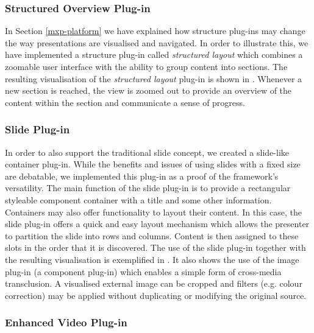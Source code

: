 \documentclass[a4paper,12pt]{report}
\begin{document}
    \subsubsection{Structured Overview Plug-in}

     In Section \ref{mxp-platform} we have explained how structure plug-ins may
     change the way presentations are visualised and navigated. In order to
     illustrate this, we have implemented a structure plug-in called
     \emph{structured layout} which combines a zoomable user interface with the
     ability to group content into sections. The resulting visualisation of the
     \emph{structured layout} plug-in is shown in .
     Whenever a new section is reached, the view is zoomed out to provide an
     overview of the content within the section and communicate a sense of
     progress.

    \subsubsection{Slide Plug-in}

     In order to also support the traditional slide concept, we created a
     slide-like container plug-in. While the benefits and issues of using
     slides with a fixed size are debatable, we implemented this plug-in as a
     proof of the framework's versatility. The main function of the slide
     plug-in is to provide a rectangular styleable component container with a
     title and some other information. Containers may also offer functionality
     to layout their content. In this case, the slide plug-in offers a quick
     and easy layout mechanism which allows the presenter to partition the
     slide into rows and columns. Content is then assigned to these slots in
     the order that it is discovered. The use of the slide plug-in together
     with the resulting visualisation is exemplified in . It
     also shows the use of the image plug-in (a component plug-in) which
     enables a simple form of cross-media transclusion. A visualised external
     image can be cropped and filters (e.g. colour correction) may be applied
     without duplicating or modifying the original source.


    \subsubsection{Enhanced Video Plug-in}
\end{document}
